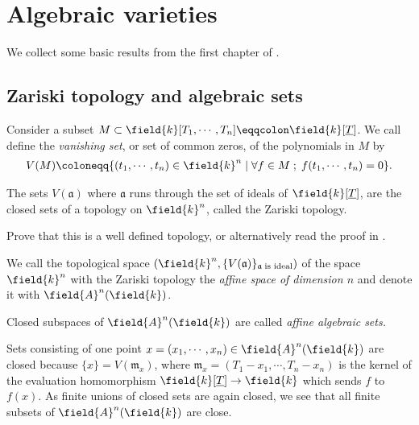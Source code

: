 
\chapter{Algebraic varieties}

We collect some basic results from the first chapter of
\cite{görtz2010algebraic}.

\section{Zariski topology and algebraic sets}


\begin{definition}
  \label{def:vanishing-sets}
  Consider a subset $M\subset \field{k}[T_1,\cdots ,T_n ] \eqqcolon
  \field{k}[\underline{T}]$. We call define the \textit{vanishing set}, or set
  of common zeros, of the polynomials in $M$ by
  \begin{align*}
    V(M)\coloneqq \{(t_1,\cdots, t_n)\in \field{k}^n\mid \forall f\in
    M \; ; \; f(t_1,\cdots, t_n)=0\}.
  \end{align*}
\end{definition}


\begin{definition}
  \label{def:zariski-topology}
  The sets $V(\mathfrak{a})$ where $\mathfrak{a}$ runs through the set
  of ideals of $\field{k}[\underline{T}]$, are the closed sets of a
  topology on $\field{k}^n$, called the Zariski topology.
\end{definition}

\begin{exercise}
  Prove that this is a well defined topology, or alternatively read
  the proof in \cite[Prop. 1.3]{görtz2010algebraic}.
\end{exercise}

\begin{definition}
  \label{def:algebraic-space}
  We call the topological space $(\field{k}^n, \{V(\mathfrak{a})\}_{\mathfrak{a}
    \; \text{is ideal}})$ of the space $\field{k}^n$ with the Zariski
  topology the \textit{affine space of dimension $n$} and denote it
  with $\field{A}^n(\field{k})$.

  Closed subspaces of $\field{A}^n(\field{k})$ are called
  \textit{affine algebraic sets.}
\end{definition}

Sets consisting of one point $x =(x_1,\cdots ,x_n) \in
\field{A}^n(\field{k})$ are closed because $\{x\} = V
(\mathfrak{m}_x)$, where $\mathfrak{m}_x =(T_1−x_1,\cdots ,T_n−x_n)$ is the kernel of the evaluation homomorphism $\field{k}[\underline{T} ] \rightarrow \field{k}$ which sends $f$ to $f (x)$. As finite unions of closed sets are again closed, we see that all finite subsets of $\field{A}^n(\field{k})$ are close.

